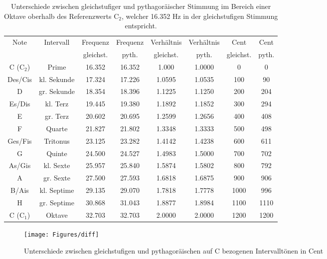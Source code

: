 \begin{enumerate}[a)]
\begin{table}
\centering
\begin{tabular}{| c | c | c | c | c | c | c | c |}
  \hline			
  Note & Intervall& Frequenz & Frequenz & Verhältnis & Verhältnis & Cent& Cent \\
  & &gleichst. & pyth. & gleichst. & pyth. & gleichst. & pyth. \\
  \hline
  C (C$_{2}$) & Prime&16.352 & 16.352 & 1.000 & 1.0000 & 0 & 0 \\
  Des/Cis & kl. Sekunde& 17.324 & 17.226 & 1.0595 & 1.0535 & 100 & 90\\
  D &gr. Sekunde &18.354 & 18.396 & 1.1225 & 1.1250 & 200 & 204\\
  Es/Dis & kl. Terz & 19.445 & 19.380 & 1.1892 & 1.1852 & 300 & 294 \\
  E & gr. Terz &20.602 & 20.695 & 1.2599 & 1.2656 & 400 & 408\\
  F & Quarte &21.827 & 21.802 & 1.3348 & 1.3333 & 500 & 498\\
  Ges/Fis & Tritonus&23.125 & 23.282 & 1.4142 & 1.4238 & 600 & 611 \\
  G & Quinte & 24.500 & 24.527 & 1.4983 & 1.5000 & 700 &  702 \\
  As/Gis & kl. Sexte& 25.957 & 25.840 & 1.5874 & 1.5802 & 800 & 792\\
  A & gr. Sexte&27.500 & 27.593 & 1.6818 & 1.6875 &  900 & 906\\
  B/Ais & kl. Septime& 29.135 & 29.070 & 1.7818 & 1.7778 & 1000 & 996 \\
  H & gr. Septime&30.868 & 31.043 & 1.8877 & 1.8984 & 1100 & 1110\\
  C (C$_{1}$)& Oktave & 32.703 & 32.703 &2.0000 &2.0000 & 1200 & 1200\\
  \hline  
\end{tabular}
\caption{Unterschiede zwischen gleichstufiger und pythagoräischer Stimmung im Bereich einer Oktave oberhalb des Referenzwerts C$_{2}$, welcher 16.352 Hz in der gleichstufigen Stimmung entspricht.}
\label{tab:t1}
\end{table}


\begin{figure}
  \centering
      \texttt{[image: Figures/diff]}
 \caption{Unterschiede zwischen gleichstufigen und pythagoräischen auf C bezogenen Intervalltönen in Cent}
	\label{fig:f1}
\end{figure}







\end{enumerate}
